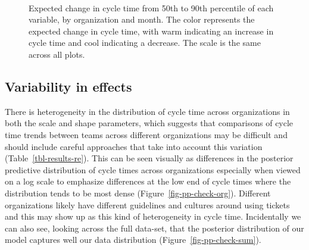 \documentclass[manuscript,screen,review]{acmart}
\begin{document}
\begin{figure}
\begin{minipage}{0.33\linewidth}

\subcaption{\label{fig-heatmaps-comments}}

\end{minipage}%
%
\begin{minipage}{0.17\linewidth}
~\end{minipage}%

\caption{\label{fig-heatmaps}Expected change in cycle time from 50th to
90th percentile of each variable, by organization and month. The color
represents the expected change in cycle time, with warm indicating an
increase in cycle time and cool indicating a decrease. The scale is the
same across all plots.}

\end{figure}%

\subsection{Variability in effects}\label{variability-in-effects}

There is heterogeneity in the distribution of cycle time across
organizations in both the scale and shape parameters, which suggests
that comparisons of cycle time trends between teams across different
organizations may be difficult and should include careful approaches
that take into account this variation (Table~\ref{tbl-results-re}). This
can be seen visually as differences in the posterior predictive
distribution of cycle times across organizations especially when viewed
on a log scale to emphasize differences at the low end of cycle times
where the distribution tends to be most dense
(Figure~\ref{fig-pp-check-org}). Different organizations likely have
different guidelines and cultures around using tickets and this may show
up as this kind of heterogeneity in cycle time. Incidentally we can also
see, looking across the full data-set, that the posterior distribution
of our model captures well our data distribution
(Figure~\ref{fig-pp-check-sum}).
\end{document}
